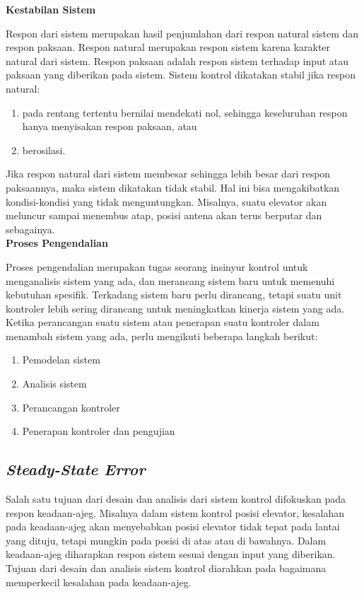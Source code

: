 \noindent \textbf{Kestabilan Sistem}

Respon dari sistem merupakan hasil penjumlahan dari respon natural sistem dan respon paksaan. Respon natural merupakan respon sistem karena karakter natural dari sistem. Respon paksaan adalah respon sistem terhadap input atau paksaan yang diberikan pada sistem.
Sistem kontrol dikatakan stabil jika respon natural:
\begin{enumerate}
	\item pada rentang tertentu bernilai mendekati nol, sehingga keseluruhan respon hanya menyisakan respon paksaan, atau
	\item berosilasi.
\end{enumerate}

Jika respon natural dari sistem membesar sehingga lebih besar dari respon paksaannya, maka sistem dikatakan tidak stabil. Hal ini bisa mengakibatkan kondisi-kondisi yang tidak menguntungkan. Misalnya, suatu elevator akan meluncur sampai menembus atap, posisi antena akan terus berputar dan sebagainya.\\

\noindent\textbf{Proses Pengendalian}

Proses pengendalian merupakan tugas seorang insinyur kontrol untuk menganalisis sistem yang ada, dan merancang sistem baru untuk memenuhi kebutuhan spesifik. Terkadang sistem baru perlu dirancang, tetapi suatu unit kontroler lebih sering dirancang untuk meningkatkan kinerja sistem yang ada. Ketika perancangan suatu sistem atau penerapan suatu kontroler dalam menambah sistem yang ada, perlu mengikuti beberapa langkah berikut: \cite{ControlSystemBook}
\begin{enumerate}
	\item Pemodelan sistem
	\item Analisis sistem
	\item Perancangan kontroler
	\item Penerapan kontroler dan pengujian
\end{enumerate}

\subsection{\textit{Steady-State Error}}

Salah satu tujuan dari desain dan analisis dari sistem kontrol difokuskan pada respon keadaan-ajeg. Misalnya dalam sistem kontrol posisi elevator, kesalahan pada keadaan-ajeg akan menyebabkan posisi elevator tidak tepat pada lantai yang dituju, tetapi mungkin pada posisi di atas atau di bawahnya. Dalam keadaan-ajeg diharapkan respon sistem sesuai dengan input yang diberikan. Tujuan dari desain dan analisis sistem kontrol diarahkan pada bagaimana memperkecil kesalahan pada keadaan-ajeg.

